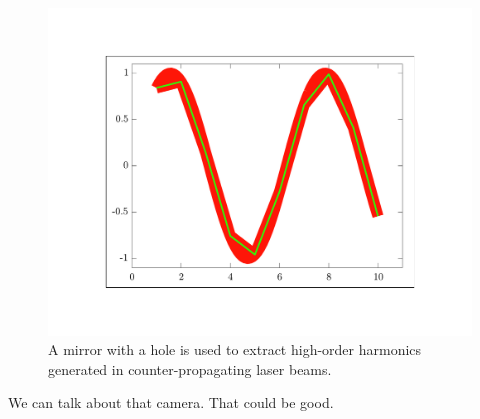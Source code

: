\begin{figure}
    \centerline{\includegraphics{testfigure}}
    \caption[]{\label{fig:MirrorDiagram}
    A mirror with a hole is used to extract high-order harmonics generated in
    counter-propagating laser beams.}
\end{figure}



We can talk about that camera. That could be good. %
